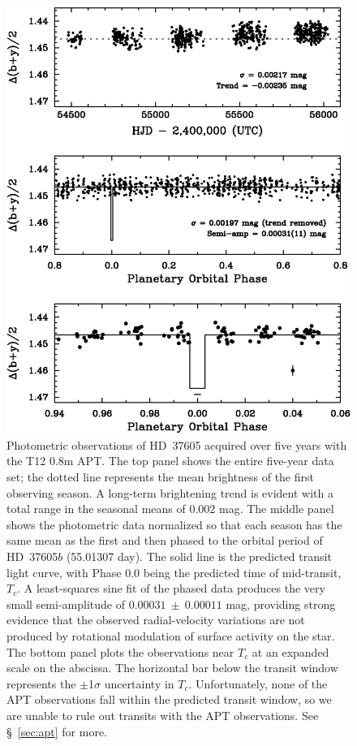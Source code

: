 \begin{figure}
\includegraphics[scale=1.15]{37605/f5.eps}
\caption{Photometric observations of HD~37605 acquired over five years with 
 the T12 0.8m APT.  The top panel shows the entire five-year data set; the 
 dotted line represents the mean brightness of the first observing season.  A 
 long-term brightening trend is evident with a total range in the seasonal 
 means of 0.002 mag.  The middle panel shows the photometric data normalized 
 so that each season has the same mean as the first and then phased to the 
 orbital period of HD~37605$b$ (55.01307 day).  The solid line is the predicted 
 transit light curve, with Phase 0.0 being the predicted time of mid-transit, 
 $T_c$.  A least-squares sine fit of the phased data produces the very small 
 semi-amplitude of $0.00031~\pm~0.00011$ mag, providing strong evidence
 that the observed radial-velocity variations are not produced by
 rotational modulation of surface
 activity on the star.  The bottom panel plots the observations near $T_c$ 
 at an expanded scale on the abscissa.  The horizontal bar below the transit 
 window represents the $\pm$1$\sigma$ uncertainty in $T_c$.  Unfortunately, 
 none of the APT observations fall within the predicted transit window, so 
 we are unable to rule out transits with the APT observations.  See 
\S~\ref{sec:apt} for more. \label{photometry}}
\end{figure}


